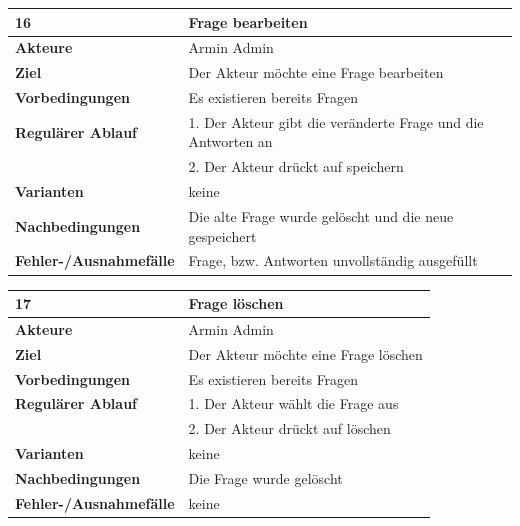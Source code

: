 \documentclass[fontsize=12pt,paper=a4,twoside]{scrartcl}
\begin{document}
\begin{table}
	[H] \label{16} 
	\begin{tabular}
		{|l|p{10cm}|} \hline \textbf{16} & \textbf{Frage bearbeiten} \\
		\hline \textbf{Akteure} & Armin Admin\\
		\hline \textbf{Ziel} & Der Akteur möchte eine Frage bearbeiten\\
		\hline \textbf{Vorbedingungen} & Es existieren bereits Fragen\\
		\hline \textbf{Regulärer Ablauf} & 1. Der Akteur gibt die veränderte Frage und die Antworten an\\
		&2. Der Akteur drückt auf speichern\\
		\hline \textbf{Varianten} & keine \\
		\hline \textbf{Nachbedingungen} & Die alte Frage wurde gelöscht und die neue gespeichert\\
		\hline \textbf{Fehler-/Ausnahmefälle} & Frage, bzw. Antworten unvollständig ausgefüllt \\
		\hline 
	\end{tabular}
\end{table}

\begin{table}
	[H] \label{17} 
	\begin{tabular}
		{|l|p{10cm}|} \hline \textbf{17} & \textbf{Frage löschen} \\
		\hline \textbf{Akteure} & Armin Admin\\
		\hline \textbf{Ziel} & Der Akteur möchte eine Frage löschen\\
		\hline \textbf{Vorbedingungen} & Es existieren bereits Fragen\\
		\hline \textbf{Regulärer Ablauf} & 1. Der Akteur wählt die Frage aus\\
		&2. Der Akteur drückt auf löschen\\
		\hline \textbf{Varianten} & keine \\
		\hline \textbf{Nachbedingungen} & Die Frage wurde gelöscht\\
		\hline \textbf{Fehler-/Ausnahmefälle} & keine\\
		\hline 
	\end{tabular}
\end{table}
\end{document}
